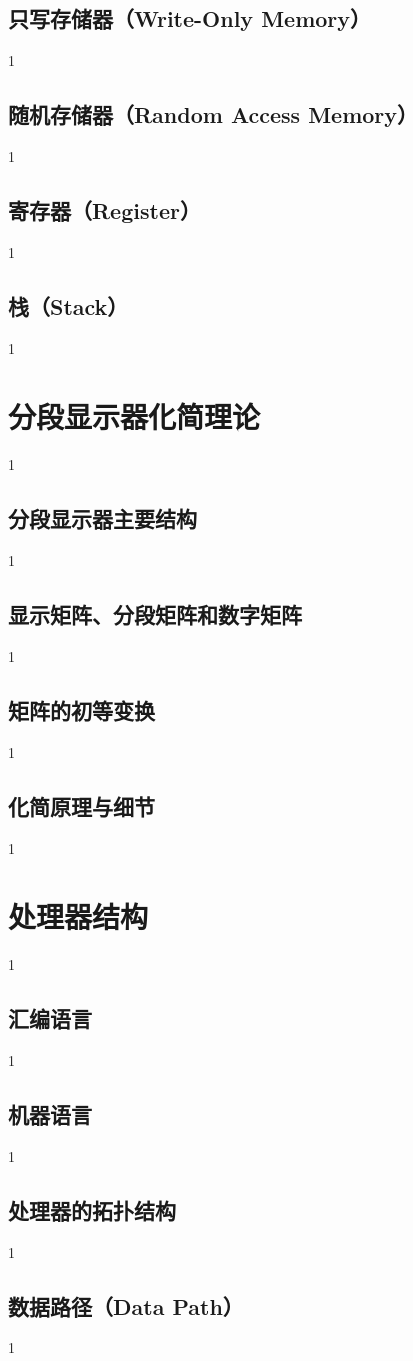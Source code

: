 \subsection{只写存储器（Write-Only Memory）}
1
\subsection{随机存储器（Random Access Memory）}
1
\subsection{寄存器（Register）}
1
\subsection{栈（Stack）}
1

\section{分段显示器化简理论}
1
\subsection{分段显示器主要结构}
1
\subsection{显示矩阵、分段矩阵和数字矩阵}
1
\subsection{矩阵的初等变换}
1
\subsection{化简原理与细节}
1

\section{处理器结构}
1
\subsection{汇编语言}
1
\subsection{机器语言}
1
\subsection{处理器的拓扑结构}
1
\subsection{数据路径（Data Path）}
1